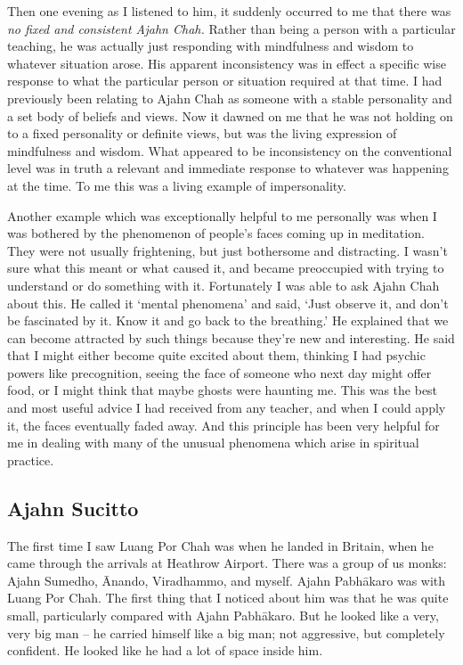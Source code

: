 Then one evening as I listened to him, it suddenly occurred to me that
there was \emph{no fixed and consistent Ajahn Chah.}
Rather than being a person
with a particular teaching, he was actually just responding with
mindfulness and wisdom to whatever situation arose. His apparent
inconsistency was in effect a specific wise response to what the
particular person or situation required at that time. I had previously
been relating to Ajahn Chah as someone with a stable personality and a
set body of beliefs and views. Now it dawned on me that he was not
holding on to a fixed personality or definite views, but was the living
expression of mindfulness and wisdom. What appeared to be inconsistency
on the conventional level was in truth a relevant and immediate response
to whatever was happening at the time. To me this was a living example
of impersonality. 

Another example which was exceptionally helpful to me personally was
when I was bothered by the phenomenon of people's faces coming up in
meditation. They were not usually frightening, but just bothersome and
distracting. I wasn't sure what this meant or what caused it, and became
preoccupied with trying to understand or do something with it. 
Fortunately I was able to ask Ajahn Chah about this. He called it
`mental phenomena' and said, `Just observe it, and don't be fascinated
by it. Know it and go back to the breathing.' He explained that we can
become attracted by such things because they're new and interesting. He
said that I might either become quite excited about them, thinking I had
psychic powers like precognition, seeing the face of someone who next
day might offer food, or I might think that maybe ghosts were haunting
me. This was the best and most useful advice I had received from any
teacher, and when I could apply it, the faces eventually faded away. And
this principle has been very helpful for me in dealing with many of the
unusual phenomena which arise in spiritual practice. 

\subsection{Ajahn Sucitto}

The first time I saw Luang Por Chah was when he landed in Britain, when
he came through the arrivals at Heathrow Airport. There was a group of
us monks: Ajahn Sumedho, Ānando, Viradhammo, and myself. Ajahn Pabhākaro
was with Luang Por Chah. The first thing that I noticed about him was
that he was quite small, particularly compared with Ajahn Pabhākaro. But
he looked like a very, very big man -- he carried himself like a big
man; not aggressive, but completely confident. He looked like he had a
lot of space inside him. 

